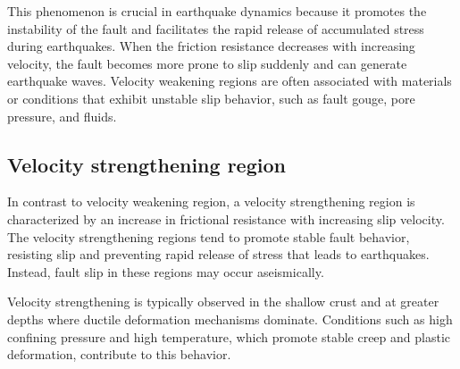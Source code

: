 This phenomenon is crucial in earthquake dynamics because it promotes the instability of the fault and facilitates the rapid release of accumulated stress during earthquakes.
When the friction resistance decreases with increasing velocity, the fault becomes more prone to slip suddenly and can generate earthquake waves.
Velocity weakening regions are often associated with materials or conditions that exhibit unstable slip behavior, such as fault gouge, pore pressure, and fluids.

\subsection{Velocity strengthening region}
In contrast to velocity weakening region, a velocity strengthening region is characterized by an increase in frictional resistance with increasing slip velocity.
The velocity strengthening regions tend to promote stable fault behavior, resisting slip and preventing rapid release of stress that leads to earthquakes.
Instead, fault slip in these regions may occur aseismically.

Velocity strengthening is typically observed in the shallow crust and at greater depths where ductile deformation mechanisms dominate. 
Conditions such as high confining pressure and high temperature, which promote stable creep and plastic deformation, contribute to this behavior.
